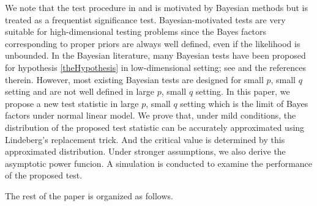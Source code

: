 \documentclass[11pt]{article}
\theoremstyle{plain}
\theoremstyle{definition}
\theoremstyle{remark}
\begin{document}
We note that the test procedure in \cite{Goeman2006} and \cite{Goeman2011} is motivated by Bayesian methods but is treated as a frequentist significance test.
Bayesian-motivated tests are very suitable for high-dimensional testing problems since the Bayes factors corresponding to proper priors are always well defined, even if the likelihood is unbounded.
In the Bayesian literature, many Bayesian tests have been proposed for hypothesis \eqref{theHypothesis} in low-dimensional setting; see \cite{javier2006Obj,Goddard2016,zhou2018On} and the references therein.
However, most existing Bayesian tests are designed for small $p$, small $q$ setting and are not well defined in large $p$, small $q$ setting.
In this paper, we propose a new test statistic in large $p$, small $q$ setting which is the limit of Bayes factors under normal linear model.
We prove that, under mild conditions, the distribution of the proposed test statistic can be accurately approximated using Lindeberg's replacement trick.
And the critical value is determined by this approximated distribution.
Under stronger assumptions, we also derive the asymptotic power funcion.
A simulation is conducted to examine the performance of the proposed test.

The rest of the paper is organized as follows.
\end{document}

